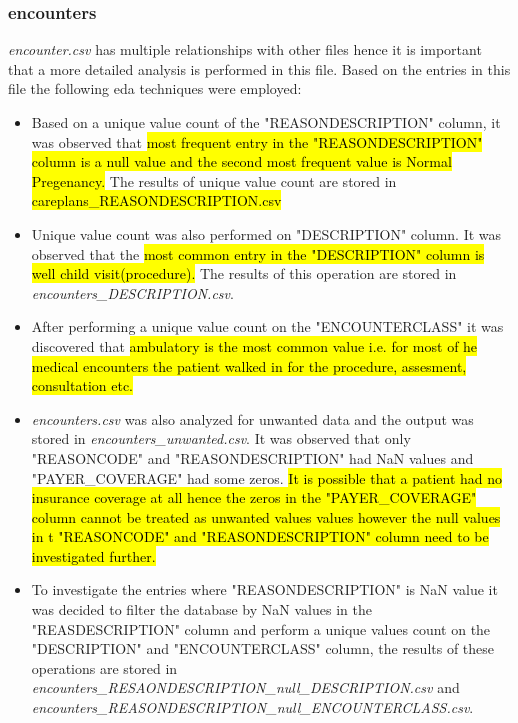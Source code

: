 \documentclass[12pt, twosided]{report}  %
\begin{document}
\subsubsection{encounters}
\textit{encounter.csv} has multiple relationships with other files hence it is important that a more detailed analysis is performed in this file. Based on the entries in this file the following eda techniques were employed:
\begin{itemize}
	\item Based on a unique value count of the "REASONDESCRIPTION" column, it was observed that \hl{most frequent entry in the "REASONDESCRIPTION" column is a null value and the second most frequent value is Normal Pregenancy.} The results of unique value count are stored in \hl{careplans\_REASONDESCRIPTION.csv}
	
	\item Unique value count was also performed on "DESCRIPTION" column. It was observed that the \hl{most common entry in the "DESCRIPTION" column is well child visit(procedure).} The results of this operation are stored in \textit{encounters\_DESCRIPTION.csv}. 
	
	\item After performing a unique value count on the "ENCOUNTERCLASS" it was discovered that \hl{ambulatory is the most common value i.e. for most of he medical encounters the patient walked in for the procedure, assesment, consultation etc.}
	
	\item \textit{encounters.csv} was also analyzed for unwanted data and the output was stored in \textit{encounters\_unwanted.csv}. It was observed that only "REASONCODE" and "REASONDESCRIPTION" had NaN values and "PAYER\_COVERAGE" had some zeros. \hl{It is possible that a patient had no insurance coverage at all hence the zeros in the "PAYER\_COVERAGE" column cannot be treated as unwanted values values however the null values in t "REASONCODE" and "REASONDESCRIPTION" column need to be investigated further.} 
	
	\item To investigate the entries where "REASONDESCRIPTION" is NaN value it was decided to filter the database by NaN values in the "REASDESCRIPTION" column and perform a unique values count on the "DESCRIPTION" and "ENCOUNTERCLASS" column, the results of these operations are stored in \textit{encounters\_RESAONDESCRIPTION\_null\_DESCRIPTION.csv} and \newline \textit{encounters\_REASONDESCRIPTION\_null\_ENCOUNTERCLASS.csv}.  
	

\end{itemize}
\end{document}
